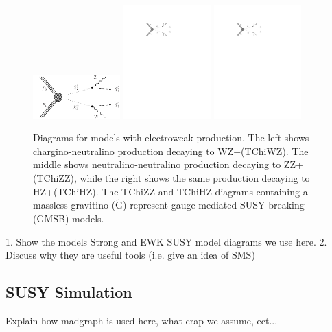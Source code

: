   \begin{figure}
    \begin{center}
      \includegraphics[width=0.3\textwidth]{figures/diagrams/TChiWZ.pdf} 
      \includegraphics[width=0.3\textwidth]{figures/diagrams/TChiZZ.pdf} 
      \includegraphics[width=0.3\textwidth]{figures/diagrams/TChiHZ.pdf} 
    \end{center}
    \caption{
      \label{fig:feynman_ewk} 
      Diagrams for models with electroweak production.
      The left shows chargino-neutralino production decaying to WZ+\MET (TChiWZ).
      The middle shows neutralino-neutralino production decaying to ZZ+\MET (TChiZZ),
      while the right shows the same production decaying to HZ+\MET (TChiHZ).
      The TChiZZ and TChiHZ diagrams containing a massless gravitino ($\tilde{\mathrm{G}}$) represent gauge mediated SUSY breaking (GMSB) models.
    }
  \end{figure}

  1. Show the models Strong and EWK SUSY model diagrams we use here.
  2. Discuss why they are useful tools (i.e. give an idea of SMS)

  \subsection{SUSY Simulation} \label{sec:susy_simulation}
    Explain how madgraph is used here, what crap we assume, ect...

